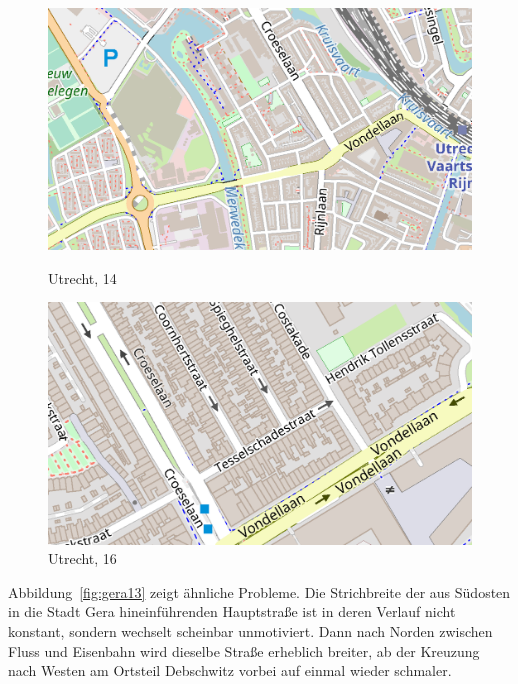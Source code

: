 \documentclass[../main/thesis.tex]{subfiles}
\begin{document}
\begin{figure}[ht]
  \begin{minipage}{.5\linewidth}
    \centering
    \includegraphics[width=\ScaleIfNeeded]{../chapter2/utrecht-z14}
    \caption{Utrecht,  14}\label{fig:utrecht14}
  \end{minipage}%
  \begin{minipage}{.5\linewidth}
    \centering
    \includegraphics[width=\ScaleIfNeeded]{../chapter2/utrecht-z16}
    \caption{Utrecht,  16}\label{fig:utrecht16}
  \end{minipage}
\end{figure}


Abbildung~\ref{fig:gera13} zeigt ähnliche Probleme. Die Strichbreite der aus Südosten in die Stadt Gera hineinführenden Hauptstraße ist in deren Verlauf nicht konstant, sondern wechselt scheinbar unmotiviert. Dann nach Norden zwischen Fluss und Eisenbahn wird dieselbe Straße erheblich breiter, ab der Kreuzung nach Westen am Ortsteil Debschwitz vorbei auf einmal wieder schmaler.
\end{document}

